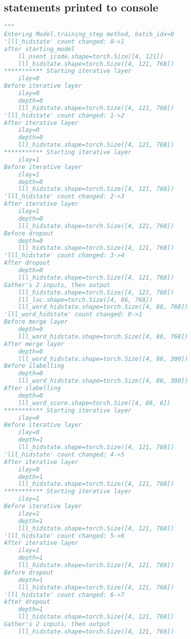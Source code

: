 \documentclass[12pt]{article}
\begin{document}
\subsection{statements printed to console}


\begin{lstlisting}[language=Python]
"""
Entering Model.training_step method, batch_idx=0
'lll_hidstate' count changed: 0->1
after starting_model
    ll_osent_icode.shape=torch.Size([4, 121])
    lll_hidstate.shape=torch.Size([4, 121, 768])
*********** Starting iterative layer
    ilay=0
Before iterative layer
    ilay=0
    depth=0
    lll_hidstate.shape=torch.Size([4, 121, 768])
'lll_hidstate' count changed: 1->2
After iterative layer
    ilay=0
    depth=0
    lll_hidstate.shape=torch.Size([4, 121, 768])
*********** Starting iterative layer
    ilay=1
Before iterative layer
    ilay=1
    depth=0
    lll_hidstate.shape=torch.Size([4, 121, 768])
'lll_hidstate' count changed: 2->3
After iterative layer
    ilay=1
    depth=0
    lll_hidstate.shape=torch.Size([4, 121, 768])
Before dropout
    depth=0
    lll_hidstate.shape=torch.Size([4, 121, 768])
'lll_hidstate' count changed: 3->4
After dropout
    depth=0
    lll_hidstate.shape=torch.Size([4, 121, 768])
Gather's 2 inputs, then output
    lll_hidstate.shape=torch.Size([4, 121, 768])
    lll_loc.shape=torch.Size([4, 86, 768])
    lll_word_hidstate.shape=torch.Size([4, 86, 768])
'lll_word_hidstate' count changed: 0->1
Before merge layer
    depth=0
    lll_word_hidstate.shape=torch.Size([4, 86, 768])
After merge layer
    depth=0
    lll_word_hidstate.shape=torch.Size([4, 86, 300])
Before ilabelling
    depth=0
    lll_word_hidstate.shape=torch.Size([4, 86, 300])
After ilabelling
    depth=0
    lll_word_score.shape=torch.Size([4, 86, 6])
*********** Starting iterative layer
    ilay=0
Before iterative layer
    ilay=0
    depth=1
    lll_hidstate.shape=torch.Size([4, 121, 768])
'lll_hidstate' count changed: 4->5
After iterative layer
    ilay=0
    depth=1
    lll_hidstate.shape=torch.Size([4, 121, 768])
*********** Starting iterative layer
    ilay=1
Before iterative layer
    ilay=1
    depth=1
    lll_hidstate.shape=torch.Size([4, 121, 768])
'lll_hidstate' count changed: 5->6
After iterative layer
    ilay=1
    depth=1
    lll_hidstate.shape=torch.Size([4, 121, 768])
Before dropout
    depth=1
    lll_hidstate.shape=torch.Size([4, 121, 768])
'lll_hidstate' count changed: 6->7
After dropout
    depth=1
    lll_hidstate.shape=torch.Size([4, 121, 768])
Gather's 2 inputs, then output
    lll_hidstate.shape=torch.Size([4, 121, 768])

\end{lstlisting}
\end{document}
